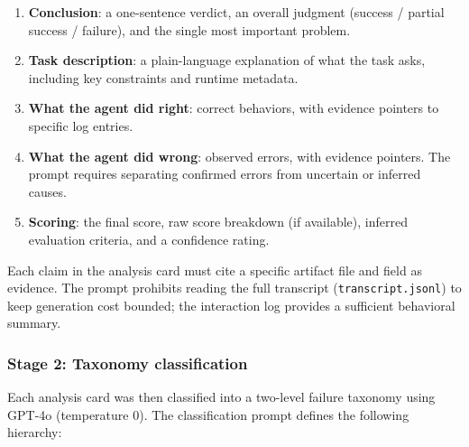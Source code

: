 \documentclass{llmxive}
\begin{document}
\begin{enumerate}[leftmargin=*,itemsep=2pt]
    \item \textbf{Conclusion}: a one-sentence verdict, an overall judgment (success / partial success / failure), and the single most important problem.
    \item \textbf{Task description}: a plain-language explanation of what the task asks, including key constraints and runtime metadata.
    \item \textbf{What the agent did right}: correct behaviors, with evidence pointers to specific log entries.
    \item \textbf{What the agent did wrong}: observed errors, with evidence pointers. The prompt requires separating confirmed errors from uncertain or inferred causes.
    \item \textbf{Scoring}: the final score, raw score breakdown (if available), inferred evaluation criteria, and a confidence rating.
\end{enumerate}

Each claim in the analysis card must cite a specific artifact file and field as evidence.
The prompt prohibits reading the full transcript (\texttt{transcript.jsonl}) to keep generation cost bounded; the interaction log provides a sufficient behavioral summary.

\subsubsection{Stage 2: Taxonomy classification}
Each analysis card was then classified into a two-level failure taxonomy using GPT-4o (temperature 0).
The classification prompt defines the following hierarchy:
\end{document}
